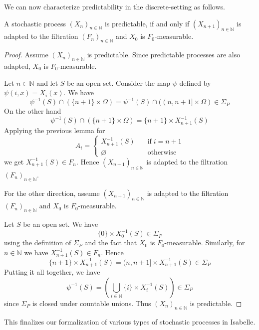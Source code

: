 We can now characterize predictability in the discrete-setting as follows.
\begin{theorem}
	A stochastic process $(X_n)_{n \in \mathbb{N}}$ is predictable, if and only if $(X_{n + 1})_{n \in \mathbb{N}}$ is adapted to the filtration $(F_n)_{n \in \mathbb{N}}$ and $X_0$ is $F_0$-measurable.
\end{theorem}
\begin{proof}
	Assume $(X_n)_{n \in \mathbb{N}}$ is predictable. Since predictable processes are also adapted, $X_0$ is $F_0$-measurable.
	
	Let $n \in \mathbb{N}$ and let $S$ be an open set. Consider the map $\psi$ defined by $\psi(i,x) = X_i(x)$. We have
	\[
		\psi^{-1}(S) \cap (\{n + 1\} \times \Omega) = \psi^{-1}(S) \cap ((n, n + 1] \times \Omega) \in \Sigma_P
	\]
	On the other hand
	\[
		\psi^{-1}(S) \cap (\{n + 1\} \times \Omega) = \{n + 1\} \times X_{n + 1}^{-1}(S)
	\]
	Applying the previous lemma for 
	\[
		A_i = 
		\begin{cases}
			X_{n + 1}^{-1}(S) &\quad \textrm{if} \; i = n + 1 \\
			\varnothing &\quad \textrm{otherwise}
		\end{cases}
	\]
	we get $X_{n + 1}^{-1}(S) \in F_n$. Hence $(X_{n + 1})_{n \in \mathbb{N}}$ is adapted to the filtration $(F_n)_{n \in \mathbb{N}}$.
	
	For the other direction, assume $(X_{n + 1})_{n \in \mathbb{N}}$ is adapted to the filtration $(F_n)_{n \in \mathbb{N}}$ and $X_0$ is $F_0$-measurable.
	
	Let $S$ be an open set. We have
	\[
		\{0\} \times X_0^{-1}(S) \in \Sigma_P
	\]
	using the definition of $\Sigma_P$ and the fact that $X_0$ is $F_0$-measurable. Similarly, for $n \in \mathbb{N}$ we have $X_{n + 1}^{-1}(S) \in F_n$. Hence
	\[
		\{n + 1\} \times X_{n + 1}^{-1}(S) = (n, n + 1] \times X_{n + 1}^{-1}(S) \in \Sigma_P
	\]
	Putting it all together, we have
	\[
		\psi^{-1}(S) = \left(\bigcup_{i \in \mathbb{N}} \{i\} \times X_i^{-1}(S) \right) \in \Sigma_P
	\]
	since $\Sigma_P$ is closed under countable unions. Thus $(X_n)_{n \in \mathbb{N}}$ is predictable.
\end{proof}

This finalizes our formalization of various types of stochastic processes in Isabelle.
